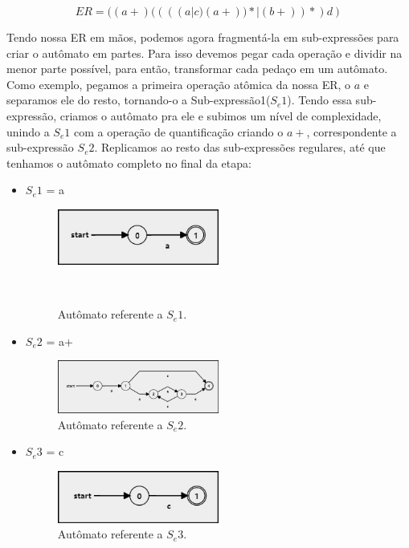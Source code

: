 \documentclass[
	article,			%
	11pt,				%
	oneside,			%
	a4paper,			%
	english,			%
	brazil,				%
	sumario=tradicional
	]{abntex2}
\begin{document}
                        \[ ER = ((a+)((((a|c)(a+))*|(b+))*)d) \]
                        
                        
    Tendo nossa ER em mãos, podemos agora fragmentá-la em sub-expressões para criar o autômato em partes. Para isso devemos pegar cada operação e dividir na menor parte possível, para então, transformar cada pedaço em um autômato. Como exemplo, pegamos a primeira operação atômica da nossa ER, o $a$ e separamos ele do resto, tornando-o a Sub-expressão1($S_e1$). Tendo essa sub-expressão, criamos o autômato pra ele e subimos um nível de complexidade, unindo a $S_e1$ com a operação de quantificação criando o $a+$, correspondente a sub-expressão $S_e2$. Replicamos ao resto das sub-expressões regulares, até que tenhamos o autômato completo no final da etapa:
    
    \begin{itemize}
        \item $S_e1$ = a 
            \begin{figure}[H]
\centering
\includegraphics[width=0.5\textwidth]{r1.jpg}
\caption{\label{fig:r1} Autômato referente a $S_e1$.}
\
\end{figure}
        \item $S_e2$ = a+ 
            \begin{figure}[H]
\centering
\includegraphics[width=0.5\textwidth]{r2.jpg}
\caption{\label{fig:r2}Autômato referente a $S_e2$.}
\end{figure}
        \item $S_e3$ = c 
            \begin{figure}[H]
\centering
\includegraphics[width=0.5\textwidth]{r3.jpg}
\caption{\label{fig:r3}Autômato referente a $S_e3$.}
\end{figure}

\end{itemize}
\end{document}
